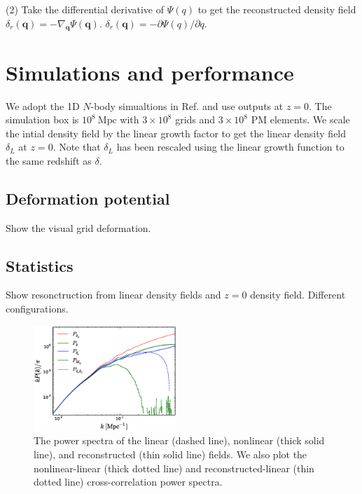 \documentclass[aps,prd,twocolumn,showpacs,superscriptaddress,groupedaddress,nofootinbib]{revtex4}  %
\newcommand{\mr}{\mathrm}
\begin{document}
(2) Take the differential derivative of $\Psi(q)$ to get the reconstructed
density field $\delta_r(\bm{q})=-\nabla_{\bm{q}}\Psi(\bm{q})$.
$\delta_r(\bm{q})=-\partial\Psi(q)/\partial q$.


\section{Simulations and performance}

We adopt the 1D $N$-body simualtions in 
Ref. \cite{2016matt}
and use outputs at $z=0$. The simulation box is $10^8\ \mr{Mpc}$ with 
$3\times10^8$ grids and $3\times10^8$ PM elements.
We scale the intial density field by the linear
growth factor to get the linear density field $\delta_L$ at $z=0$. 
Note that $\delta_L$ has been rescaled using the linear growth function
to the same redshift as $\delta$. 

\subsection{Deformation potential}
Show the visual grid deformation.  

\subsection{Statistics}
Show resonctruction from linear density fields and $z=0$ density field.
Different configurations.

\begin{figure}[tbp]
\begin{center}
\includegraphics[width=0.48\textwidth]{f3x.eps}
\end{center}
\vspace{-0.7cm}
\caption{The power spectra of the linear (dashed line), nonlinear (thick solid
line), and reconstructed (thin solid line) fields. 
We also plot the nonlinear-linear (thick dotted line) and 
reconstructed-linear (thin dotted line) cross-correlation power spectra.}
\label{fig:ps}
\end{figure}
\end{document}
